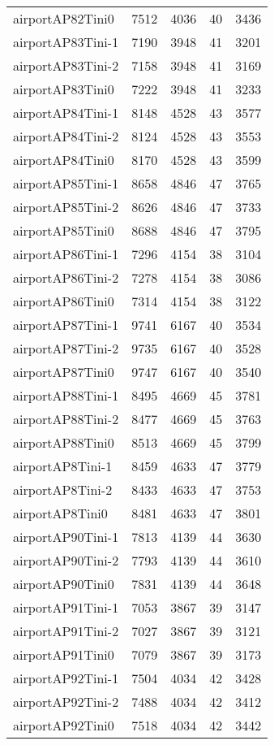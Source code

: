 \begin{longtable}{lrrrr}
airportAP82Tini0 & 7512 & 4036 & 40 & 3436 \\
airportAP83Tini-1 & 7190 & 3948 & 41 & 3201 \\
airportAP83Tini-2 & 7158 & 3948 & 41 & 3169 \\
airportAP83Tini0 & 7222 & 3948 & 41 & 3233 \\
airportAP84Tini-1 & 8148 & 4528 & 43 & 3577 \\
airportAP84Tini-2 & 8124 & 4528 & 43 & 3553 \\
airportAP84Tini0 & 8170 & 4528 & 43 & 3599 \\
airportAP85Tini-1 & 8658 & 4846 & 47 & 3765 \\
airportAP85Tini-2 & 8626 & 4846 & 47 & 3733 \\
airportAP85Tini0 & 8688 & 4846 & 47 & 3795 \\
airportAP86Tini-1 & 7296 & 4154 & 38 & 3104 \\
airportAP86Tini-2 & 7278 & 4154 & 38 & 3086 \\
airportAP86Tini0 & 7314 & 4154 & 38 & 3122 \\
airportAP87Tini-1 & 9741 & 6167 & 40 & 3534 \\
airportAP87Tini-2 & 9735 & 6167 & 40 & 3528 \\
airportAP87Tini0 & 9747 & 6167 & 40 & 3540 \\
airportAP88Tini-1 & 8495 & 4669 & 45 & 3781 \\
airportAP88Tini-2 & 8477 & 4669 & 45 & 3763 \\
airportAP88Tini0 & 8513 & 4669 & 45 & 3799 \\
airportAP8Tini-1 & 8459 & 4633 & 47 & 3779 \\
airportAP8Tini-2 & 8433 & 4633 & 47 & 3753 \\
airportAP8Tini0 & 8481 & 4633 & 47 & 3801 \\
airportAP90Tini-1 & 7813 & 4139 & 44 & 3630 \\
airportAP90Tini-2 & 7793 & 4139 & 44 & 3610 \\
airportAP90Tini0 & 7831 & 4139 & 44 & 3648 \\
airportAP91Tini-1 & 7053 & 3867 & 39 & 3147 \\
airportAP91Tini-2 & 7027 & 3867 & 39 & 3121 \\
airportAP91Tini0 & 7079 & 3867 & 39 & 3173 \\
airportAP92Tini-1 & 7504 & 4034 & 42 & 3428 \\
airportAP92Tini-2 & 7488 & 4034 & 42 & 3412 \\
airportAP92Tini0 & 7518 & 4034 & 42 & 3442 \\

\end{longtable}

